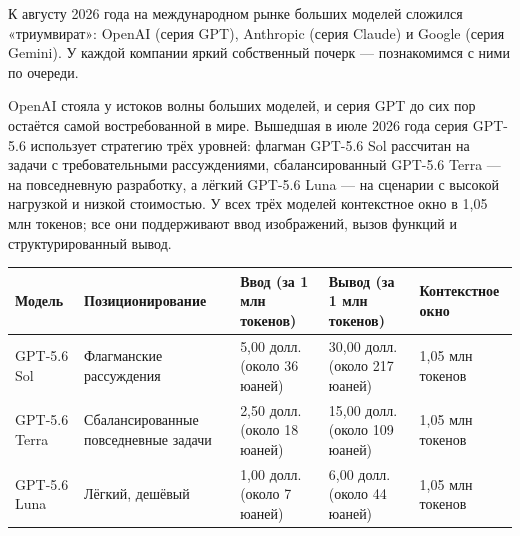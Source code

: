 


К августу 2026 года на международном рынке больших моделей сложился «триумвират»: OpenAI (серия GPT), Anthropic (серия Claude) и Google (серия Gemini). У каждой компании яркий собственный почерк — познакомимся с ними по очереди.


OpenAI стояла у истоков волны больших моделей, и серия GPT до сих пор остаётся самой востребованной в мире. Вышедшая в июле 2026 года серия GPT-5.6 использует стратегию трёх уровней: флагман GPT-5.6 Sol рассчитан на задачи с требовательными рассуждениями, сбалансированный GPT-5.6 Terra — на повседневную разработку, а лёгкий GPT-5.6 Luna — на сценарии с высокой нагрузкой и низкой стоимостью. У всех трёх моделей контекстное окно в 1,05 млн токенов; все они поддерживают ввод изображений, вызов функций и структурированный вывод.

\begin{center}
\begin{tabularx}{\linewidth}{|X|X|X|X|X|}
\hline
\textbf{Модель} & \textbf{Позиционирование} & \textbf{Ввод (за 1 млн токенов)} & \textbf{Вывод (за 1 млн токенов)} & \textbf{Контекстное окно} \tabularnewline
\hline
GPT-5.6 Sol & Флагманские рассуждения & 5,00 долл. (около 36 юаней) & 30,00 долл. (около 217 юаней) & 1,05 млн токенов \tabularnewline
GPT-5.6 Terra & Сбалансированные повседневные задачи & 2,50 долл. (около 18 юаней) & 15,00 долл. (около 109 юаней) & 1,05 млн токенов \tabularnewline
GPT-5.6 Luna & Лёгкий, дешёвый & 1,00 долл. (около 7 юаней) & 6,00 долл. (около 44 юаней) & 1,05 млн токенов \tabularnewline
\hline
\end{tabularx}
\end{center}

